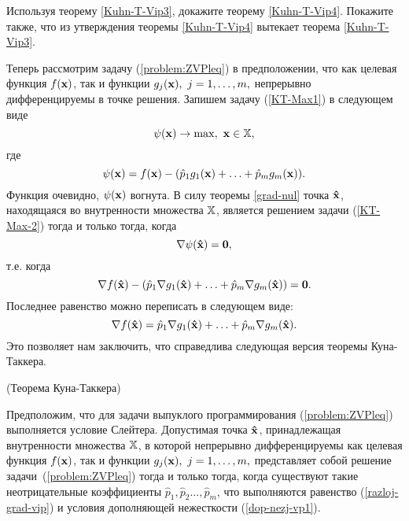 \begin{exer}
    Используя теорему \ref{Kuhn-T-Vip3}, докажите теорему
    \ref{Kuhn-T-Vip4}. Покажите также, что из утверждения теоремы
    \ref{Kuhn-T-Vip4} вытекает теорема \ref{Kuhn-T-Vip3}.
\end{exer}





    Теперь рассмотрим задачу (\ref{problem:ZVPleq}) в предположении,
    что как целевая функция $f(\mathbf{x})$, так и функции $g_{j}(\mathbf{x}), \
    j=1,\ldots,m,$ непрерывно дифференцируемы в точке решения.
    Запишем задачу (\ref{KT-Max1})  в следующем виде
\begin{equation}\label{KT-Max-3}
    \psi(\mathbf{x})\rightarrow\max, \ \mathbf{x}\in\mathbb{X},
\end{equation}
    где
\[
    \psi(\mathbf{x})=f(\mathbf{x}) - (\hat p_1 g_1(\mathbf{x})+ \ldots + \hat p_m
    g_m(\mathbf{x})).
\]
    Функция очевидно,  $\psi(\mathbf{x})$ вогнута. В силу теоремы \ref{grad-nul}
    точка $\mathbf{\hat{x}}$, находящаяся во внутренности множества $\mathbb{X}$,
    является решением задачи (\ref{KT-Max-2}) тогда и только тогда,
    когда
\[
    \nabla\psi(\mathbf{\hat{x}})=\mathbf{0},
\]
    т.е. когда
\[
    \nabla f(\mathbf{\hat{x}})
    - (\hat p_1 \nabla g_1(\mathbf{\hat{x}})+ \ldots + \hat p_m \nabla g_m(\mathbf{\hat{x}}))=\mathbf{0}.
\]
    Последнее равенство можно переписать в следующем виде:
\begin{equation}\label{razloj-grad-vip}
    \nabla f(\mathbf{\hat{x}})=
    \hat p_1 \nabla g_1(\mathbf{\hat{x}})+ \ldots + \hat p_m \nabla g_m(\mathbf{\hat{x}}).
\end{equation}
    Это позволяет нам заключить, что справедлива следующая версия
    теоремы Куна-Таккера.

\begin{teop}\label{Kuhn-T-Vip5}(Теорема Куна-Таккера)

    Предположим, что для задачи выпуклого программирования
    (\ref{problem:ZVPleq}) выполняется условие Слейтера.
    Допустимая точка $\mathbf{\hat x}$, принадлежащая внутренности
    множества $\mathbb{X}$, в которой непрерывно дифференцируемы
    как целевая функция $f(\mathbf{x})$, так и функции $g_{j}(\mathbf{x}), \
    j=1,\ldots,m,$ представляет собой решение
    задачи~(\ref{problem:ZVPleq}) тогда и только тогда, когда существуют такие
    неотрицательные коэффициенты $\hat p_1, \hat p_2 \ldots, \hat p_m$,
    что выполняются равенство (\ref{razloj-grad-vip}) и
    условия дополняющей нежесткости (\ref{dop-nezj-vp1}).
\end{teop}


